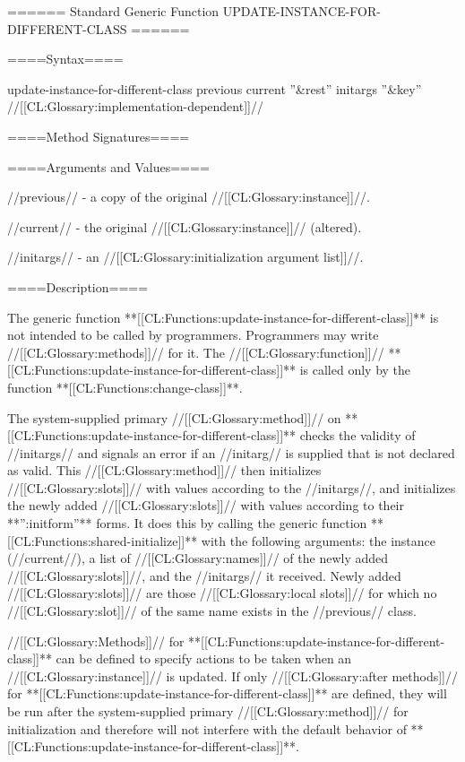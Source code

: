 ====== Standard Generic Function UPDATE-INSTANCE-FOR-DIFFERENT-CLASS ======

====Syntax====


\DefgenWithValues update-instance-for-different-class {previous current ''&rest'' initargs ''&key'' {\allowotherkeys}} {//[[CL:Glossary:implementation-dependent]]//}


====Method Signatures====

 {}

====Arguments and Values====

//previous// - a copy of the original //[[CL:Glossary:instance]]//.

//current// - the original //[[CL:Glossary:instance]]// (altered).

//initargs// - an //[[CL:Glossary:initialization argument list]]//.

====Description====

The generic function **[[CL:Functions:update-instance-for-different-class]]** is not intended to be called by programmers. Programmers may write //[[CL:Glossary:methods]]// for it. The //[[CL:Glossary:function]]// **[[CL:Functions:update-instance-for-different-class]]** is called only by the function **[[CL:Functions:change-class]]**.

The system-supplied primary //[[CL:Glossary:method]]// on **[[CL:Functions:update-instance-for-different-class]]** checks the validity of //initargs// and signals an error if an //initarg// is supplied that is not declared as valid. This //[[CL:Glossary:method]]// then initializes //[[CL:Glossary:slots]]// with values according to the //initargs//, and initializes the newly added //[[CL:Glossary:slots]]// with values according to their **'':initform''** forms. It does this by calling the generic function **[[CL:Functions:shared-initialize]]** with the following arguments: the instance (//current//), a list of //[[CL:Glossary:names]]// of the newly added //[[CL:Glossary:slots]]//, and the //initargs// it received. Newly added //[[CL:Glossary:slots]]// are those //[[CL:Glossary:local slots]]// for which no //[[CL:Glossary:slot]]// of the same name exists in the //previous// class.

//[[CL:Glossary:Methods]]// for **[[CL:Functions:update-instance-for-different-class]]** can be defined to specify actions to be taken when an //[[CL:Glossary:instance]]// is updated. If only //[[CL:Glossary:after methods]]// for **[[CL:Functions:update-instance-for-different-class]]** are defined, they will be run after the system-supplied primary //[[CL:Glossary:method]]// for initialization and therefore will not interfere with the default behavior of **[[CL:Functions:update-instance-for-different-class]]**.

